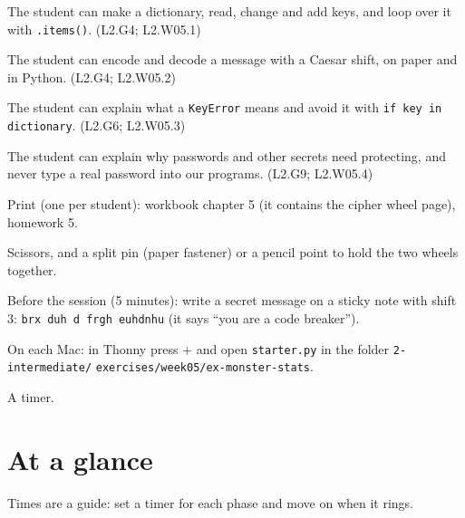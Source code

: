 
\begin{objectives}
  \item The student can make a dictionary, read, change and add keys, and loop over it with \texttt{.items()}. (L2.G4; L2.W05.1)
  \item The student can encode and decode a message with a Caesar shift, on paper and in Python. (L2.G4; L2.W05.2)
  \item The student can explain what a \texttt{KeyError} means and avoid it with \texttt{if key in dictionary}. (L2.G6; L2.W05.3)
  \item The student can explain why passwords and other secrets need protecting, and never type a real password into our programs. (L2.G9; L2.W05.4)
\end{objectives}

\begin{materials}
  \item Print (one per student): workbook chapter 5 (it contains the cipher wheel page), homework 5.
  \item Scissors, and a split pin (paper fastener) or a pencil point to hold the two wheels together.
  \item Before the session (5 minutes): write a secret message on a sticky note with shift 3: \texttt{brx duh d frgh euhdnhu}
        (it says \enquote{you are a code breaker}).
  \item On each Mac: in Thonny press + and open \texttt{starter.py} in the folder \texttt{2-intermediate/} \texttt{exercises/week05/ex-monster-stats}.
  \item A timer.
\end{materials}

\section{At a glance}
Times are a guide: set a timer for each phase and move on when it rings.
\begin{timeplan}
\end{timeplan}

